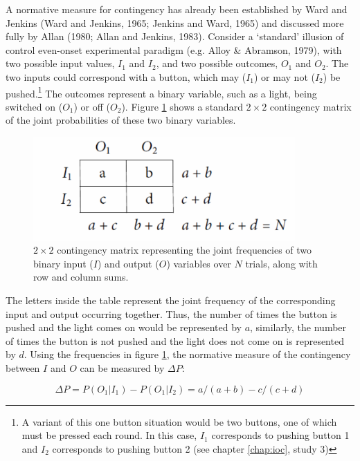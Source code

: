 \documentclass[USenglish,letterpaper,12pt,extrafontsizes,oneside,onecolumn,final]{memoir}
\begin{document}
A normative measure for contingency has already been established by Ward and Jenkins (Ward and Jenkins, 1965; Jenkins and Ward, 1965) and discussed more fully by Allan (1980; Allan and Jenkins, 1983).  Consider a `standard' illusion of control even-onset experimental paradigm (e.g. Alloy \& Abramson, 1979), with two possible input values, $I_1$ and $I_2$, and two possible outcomes, $O_1$ and $O_2$.  The two inputs could correspond with a button, which may ($I_1$) or may not ($I_2$) be pushed.\footnote{A variant of this one button situation would be two buttons, one of which must be pressed each round.  In this case, $I_1$ corresponds to pushing button 1 and $I_2$ corresponds to pushing button 2 (see chapter \ref{chap:ioc}, study 3)} The outcomes represent a binary variable, such as a light, being switched on ($O_1$) or off ($O_2$).  Figure \ref{fig:contingency} shows a standard $2 \times 2$ contingency matrix of the joint probabilities of these two binary variables.
\begin{figure}[t]
\begin{center}
\includegraphics[width=10cm]{contingencytable}
\caption{\textsf{$2 \times 2$ contingency matrix representing the joint frequencies of two binary input ($I$) and output ($O$) variables over $N$ trials, along with row and column sums.}\label{fig:contingency}}
\end{center}
\end{figure}

The letters inside the table represent the joint frequency of the corresponding input and output occurring together.  Thus, the number of times the button is pushed and the light comes on would be represented by $a$, similarly, the number of times the button is not pushed and the light does not come on is represented by $d$.  Using the frequencies in figure \ref{fig:contingency}, the normative measure of the contingency between $I$ and $O$ can be measured by $\Delta P$:

\begin{equation}
\Delta P = P(O_1|I_1) - P(O_1|I_2) = a/(a+b) - c/(c+d)
\end{equation}
\end{document}
